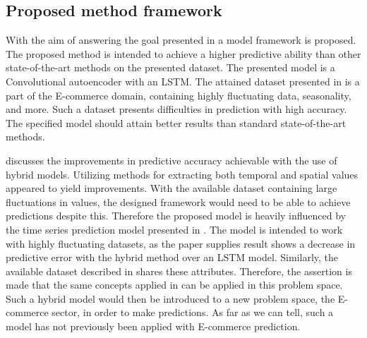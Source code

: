 \subsection{Proposed method framework}


With the aim of answering the goal presented in  a model framework is proposed.
The proposed method is intended to achieve a higher predictive ability than other state-of-the-art methods on the presented dataset.
The presented model is a Convolutional autoencoder with an LSTM.
The attained dataset presented in 
is a part of the E-commerce domain, containing highly fluctuating data, seasonality, and more.
Such a dataset presents difficulties in prediction with high accuracy. The specified model should attain better results than standard state-of-the-art methods.

 discusses the improvements in predictive accuracy achievable with the use of hybrid models.
Utilizing methods for extracting both temporal and spatial values appeared to yield improvements.
With the available dataset containing large fluctuations in values, the designed framework would need to be able to achieve predictions despite this.
Therefore the proposed model is heavily influenced by the time series prediction model presented in \cite{Zhao2019}.
The model is intended to work with highly fluctuating datasets, as the paper supplies result shows a decrease in predictive error with the hybrid method over an LSTM model.
Similarly, the available dataset described in
 shares these attributes.
Therefore, the assertion is made that the same concepts applied in \cite{Zhao2019} can be applied in this problem space.
Such a hybrid model would then be introduced to a new problem space, the E-commerce sector, in order to make predictions.
As far as we can tell, such a model has not previously been applied with E-commerce prediction.

